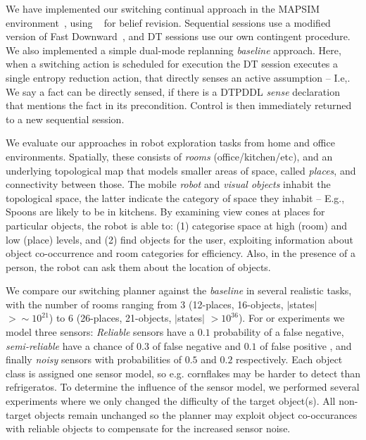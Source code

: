 
We have implemented our switching continual approach in the MAPSIM
environment~\cite{brenner:nebel:jaamas09},
using ~\cite{king:2009} for belief
revision. Sequential sessions use a modified version of Fast
Downward~\cite{fast-downward}, and DT sessions use our own contingent
procedure. We also implemented a simple dual-mode replanning {\em
baseline} approach. Here, when a switching action is scheduled for
execution the DT session executes a single entropy reduction action,
that directly senses an active assumption -- I.e,. We say a fact can
be directly sensed, if there is a DTPDDL {\em sense} declaration that
mentions the fact in its precondition.  Control is then immediately
returned to a new sequential session.


We evaluate our approaches in robot exploration tasks from home and
office environments. Spatially, these consists of {\em rooms}
(office/kitchen/etc), and an underlying topological map that models
smaller areas of space, called {\em places}, and connectivity between
those. The mobile {\em robot} and {\em visual objects} inhabit the
topological space, the latter indicate the category of space they
inhabit -- E.g., Spoons are likely to be in kitchens. By examining
view cones at places for particular objects, the robot is able to: (1)
categorise space at high (room) and low (place) levels, and (2) find
objects for the user, exploiting information about object
co-occurrence and room categories for efficiency. Also, in the
presence of a person, the robot can ask them about the location of
objects. 


We compare our switching planner against the {\em baseline} in several
realistic tasks, with the number of rooms ranging from 3 (12-places,
16-objects, $|$states$|$$>\sim10^{21}$) to 6 (26-places, 21-objects,
$|$states$|$ $>10^{36}$). For or experiments we model three sensors:
{\em Reliable} sensors have a $0.1$ probability of a false negative,
{\em semi-reliable} have a chance of $0.3$ of false negative and $0.1$
of false positive , and finally {\em noisy} sensors with probabilities
of $0.5$ and $0.2$ respectively. Each object class is assigned one
sensor model, so e.g. cornflakes may be harder to detect than
refrigeratos. To determine the influence of the sensor model, we
performed several experiments where we only changed the difficulty of
the target object(s). All non-target objects remain unchanged so the
planner may exploit object co-occurances with reliable objects to
compensate for the increased sensor noise.

